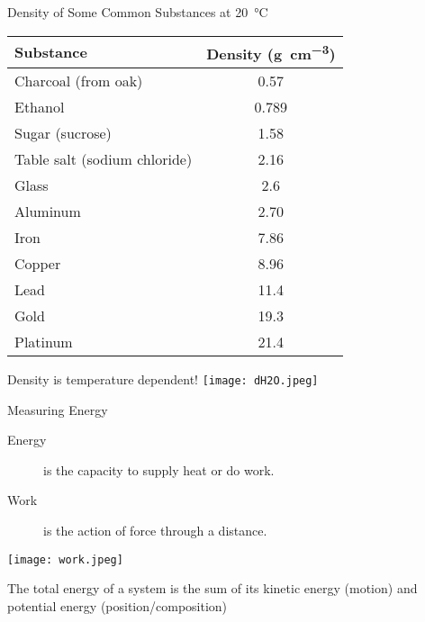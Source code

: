 \documentclass[10pt,letterpaper,twoside]{article}
\begin{document}
\begin{frame}{Density of Some Common Substances at \SI{20}{\celsius}}
	\begin{center}
		\begin{tabular}{l S[table-format=2.3]}
			\toprule
			\bfseries Substance & \textbf{Density (\si{\gram\per\centi\meter\cubed})} \\
			\midrule
			Charcoal (from oak) & 0.57 \\
			Ethanol & 0.789 \\
			Sugar (sucrose) & 1.58 \\
			Table salt (sodium chloride) & 2.16 \\
			Glass & 2.6 \\
			Aluminum & 2.70 \\
			Iron & 7.86 \\
			Copper & 8.96 \\
			Lead & 11.4 \\
			Gold & 19.3 \\
			Platinum & 21.4 \\
			\bottomrule
		\end{tabular}
	\end{center}
\end{frame}


\begin{frame}{Density is temperature dependent!}
	\centering
	\texttt{[image: dH2O.jpeg]}
\end{frame}

\begin{frame}{Measuring Energy}
	\begin{description}
		\item[Energy] is the capacity to supply heat or do work.
		\item[Work] is the action of force through a distance.
	\end{description}

	\begin{center}
		\texttt{[image: work.jpeg]}
	\end{center}

	The \alert{total energy} of a system is the sum of its \alert{kinetic
	energy} (motion) and \alert{potential energy} (position/composition)
\end{frame}
\end{document}
